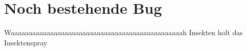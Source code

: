 \section{Noch bestehende Bug}

Waaaaaaaaaaaaaaaaaaaaaaaaaaaaaaaaaaaaaaaaaaaaaaaah Insekten holt das Insektenspray